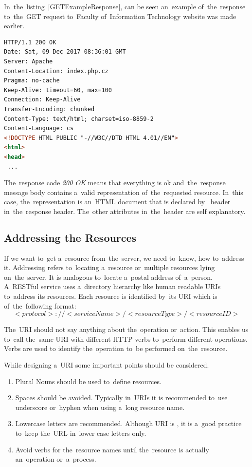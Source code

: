 In~the~listing~\ref{GETExampleResponse}, can be seen an~example
of~the~response to~the~GET request to~Faculty
of~Information Technology website was made earlier.

\vspace{2mm}
\begin{lstlisting}[caption=A~sample of~a~simplified response to~a~GET Request.,
label=GETExampleResponse, language=HTML]
HTTP/1.1 200 OK
Date: Sat, 09 Dec 2017 08:36:01 GMT
Server: Apache
Content-Location: index.php.cz
Pragma: no-cache
Keep-Alive: timeout=60, max=100
Connection: Keep-Alive
Transfer-Encoding: chunked
Content-Type: text/html; charset=iso-8859-2
Content-Language: cs
<!DOCTYPE HTML PUBLIC "-//W3C//DTD HTML 4.01//EN">
<html>
<head>
 ...
\end{lstlisting}

The~response code \textit{200 OK} means that everything is ok
and~the~response message body contains a~valid representation of~the~requested resource.
In~this case, the~representation is an~HTML document that is declared
by~ header in~the~response header. The~other attributes
in~the~header are self explanatory.

\subsection{Addressing the Resources}
If we want to~get a~resource from~the~server, we need to~know, how to~address
it. Addressing refers to~locating a~resource or~multiple resources lying
on~the~server. It is analogous to~locate a~postal address of~a~person. A~RESTful
service uses a~directory hierarchy like human readable URIs to~address its
resources. Each resource is identified by~its URI which is of~the~following
format:
\begin{equation*}
<protocol>://<serviceName>/<resourceType>/<resourceID>
\end{equation*}

The~URI should not say anything about the~operation or~action. This enables us
to~call the~same URI with different HTTP verbs to~perform different operations.
Verbs are used to identify the~operation to~be performed on~the~resource.

While designing a~URI some important points should be considered.

\begin{enumerate}
  \item Plural Nouns should be used to~define resources.
  \item Spaces should be avoided. Typically in~URIs it is recommended
  to~use underscore or~hyphen when using a~long resource name.
  \item Lowercase letters are recommended. Although URI is
  , it is a~good practice to~keep the~URL in~lower case
  letters only.
  \item Avoid verbs for the~resource names until the~resource is
  actually an~operation or~a~process. 
\end{enumerate}

